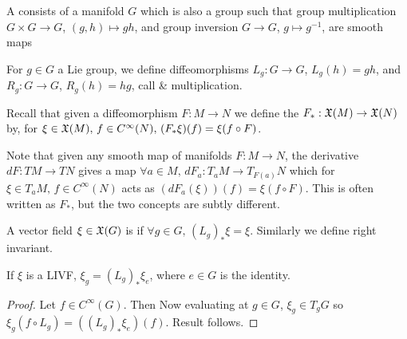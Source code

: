 \documentclass{article}
\begin{document}
\begin{definition}
	A  consists of a manifold $G$ which is also a group such that group multiplication $G \times G \to G$, $(g,h)\mapsto gh$, and group inversion $G \to G$, $g \mapsto g^{-1}$, are smooth maps
\end{definition}

For $g \in G$ a Lie group, we define diffeomorphisms $L_g : G \to G$, $L_g(h) = gh$, and $R_g : G \to G$, $R_g(h) = hg$, call  \&  multiplication. 

\begin{definition}
	Recall that given a diffeomorphism $F:M \to N$ we define the  $F_\ast : \mathfrak{X}(M) \to \mathfrak{X}(N)$ by, for $\xi \in \mathfrak{X}(M), \, f \in C^\infty(N), \, (F_\ast \xi)(f) = \xi(f \circ F)$.
\end{definition}

\begin{remark}
	Note that given any smooth map of manifolds $F:M \to N$, the derivative $dF:TM \to TN$ gives a map $\forall a \in M, \, dF_a : T_a M \to T_{F(a)}N$ which for $\xi \in T_a M, \, f \in C^\infty(N)$ acts as $(dF_a(\xi))(f) = \xi(f \circ F)$. This is often written as $F_\ast$, but the two concepts are subtly different.
\end{remark}

\begin{definition}
	A vector field $\xi\in \mathfrak{X}(G)$ is  if $\forall g \in G, \, (L_g)_\ast \xi = \xi$. Similarly we define right invariant.
\end{definition}

\begin{lemma}
	If $\xi$ is a LIVF, $\xi_g = (L_g)_\ast \xi_e$, where $e\in G$ is the identity.
\end{lemma}
\begin{proof}
	Let $f \in C^\infty(G)$. Then
	Now evaluating at $g \in G$, $\xi_g \in T_gG$ so $\xi_g(f \circ L_g)= ((L_g)_\ast \xi_e)(f)$. Result follows. 
\end{proof}
\end{document}
